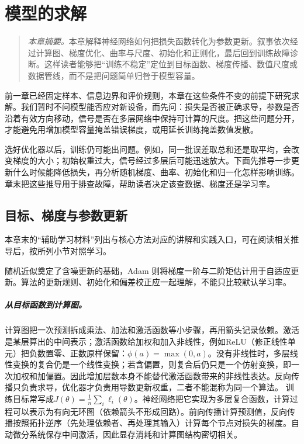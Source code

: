 \chapter{模型的求解}

\begin{quote}\small
\textit{本章摘要。}本章解释神经网络如何把损失函数转化为参数更新。叙事依次经过计算图、梯度优化、曲率与尺度、初始化和正则化，最后回到训练故障诊断。这样读者能够把“训练不稳定”定位到目标函数、梯度传播、数值尺度或数据管线，而不是把问题简单归咎于模型容量。
\end{quote}

前一章已经固定样本、信息边界和评价规则，本章在这些条件不变的前提下研究求解。我们暂时不问模型能否应对新设备，而先问：损失是否被正确求导，参数是否沿着有效方向移动，信号是否在多层网络中保持可计算的尺度。把这些问题分开，才能避免用增加模型容量掩盖错误梯度，或用延长训练掩盖数值发散。

选好优化器以后，训练仍可能出问题。例如，同一批误差取总和还是取平均，会改变梯度的大小；初始权重过大，信号经过多层后可能迅速放大。下面先推导一步更新什么时候能降低损失，再分析随机梯度、曲率、初始化和归一化怎样影响训练。章末把这些推导用于排查故障，帮助读者决定该查数据、梯度还是学习率。

\section{目标、梯度与参数更新}

本章末的“辅助学习材料”列出与核心方法对应的讲解和实践入口，可在阅读相关推导后，按所列小节对照学习。

随机近似奠定了含噪更新的基础，Adam 则将梯度一阶与二阶矩估计用于自适应更新\cite{robbins1951stochastic,kingma2015adam}。算法的更新规则、初始化和偏差校正应一起理解，不能只比较默认学习率。
\paragraph{从目标函数到计算图。}
计算图把一次预测拆成乘法、加法和激活函数等小步骤，再用箭头记录依赖。激活是某层算出的中间表示；激活函数给加权和加入非线性，例如ReLU（修正线性单元）把负数置零、正数原样保留：$\phi(a)=\max(0,a)$。没有非线性时，多层线性变换的复合仍是一个线性变换；若含偏置，则复合后仍只是一个仿射变换，即一次加权和加偏置。因此增加层数本身不能替代激活函数带来的非线性表达。反向传播只负责求导，优化器才负责用导数更新权重，二者不能混称为同一个算法。
训练目标常写成$J(\theta)=\frac1n\sum_i\ell_i(\theta)$。神经网络把它实现为多层复合函数，计算过程可以表示为有向无环图（依赖箭头不形成回路）。前向传播计算预测值，反向传播按照拓扑逆序（先处理依赖者、再处理其输入）计算每个节点对损失的梯度。自动微分系统保存中间激活，因此显存消耗和计算图结构密切相关。

